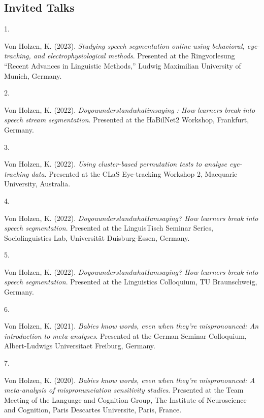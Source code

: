 \documentclass[10pt,a4paper,]{article}
\newlength{\cslhangindent}
\newlength{\csllabelwidth}
\newcommand{\CSLLeftMargin}[1]{\parbox[t]{\csllabelwidth}{\hfill #1~}}
\newcommand{\CSLRightInline}[1]{\parbox[t]{\linewidth - \cslhangindent - \csllabelwidth}{#1}\vspace{0.8ex}}
\begin{document}
\hypertarget{invited-talks}{%
\subsection{Invited Talks}\label{invited-talks}}

\hypertarget{bibliography}{}
\leavevmode{}%
\CSLLeftMargin{1. }%
\CSLRightInline{Von Holzen, K. (2023). \emph{Studying speech
segmentation online using behavioral, eye-tracking, and
electrophysiological methods}. Presented at the Ringvorlesung {``Recent
Advances in Linguistic Methods,''} Ludwig Maximilian University of
Munich, Germany.}

\leavevmode{}%
\CSLLeftMargin{2. }%
\CSLRightInline{Von Holzen, K. (2022). \emph{Doyouunderstandwhatimsaying
: How learners break into speech stream segmentation}. Presented at the
HaBilNet2 Workshop, Frankfurt, Germany.}

\leavevmode{}%
\CSLLeftMargin{3. }%
\CSLRightInline{Von Holzen, K. (2022). \emph{Using cluster-based
permutation tests to analyse eye-tracking data}. Presented at the CLaS
Eye-tracking Workshop 2, Macquarie University, Australia.}

\leavevmode{}%
\CSLLeftMargin{4. }%
\CSLRightInline{Von Holzen, K. (2022).
\emph{DoyouunderstandwhatIamsaying? How learners break into speech
segmentation}. Presented at the LinguisTisch Seminar Series,
Sociolinguistics Lab, Universität Duisburg-Essen, Germany.}

\leavevmode{}%
\CSLLeftMargin{5. }%
\CSLRightInline{Von Holzen, K. (2022).
\emph{DoyouunderstandwhatIamsaying? How learners break into speech
segmentation}. Presented at the Linguistics Colloquium, TU Braunschweig,
Germany.}

\leavevmode{}%
\CSLLeftMargin{6. }%
\CSLRightInline{Von Holzen, K. (2021). \emph{Babies know words, even
when they're mispronounced: An introduction to meta-analyses}. Presented
at the German Seminar Colloquium, Albert-Ludwigs Universitaet Freiburg,
Germany.}

\leavevmode{}%
\CSLLeftMargin{7. }%
\CSLRightInline{Von Holzen, K. (2020). \emph{Babies know words, even
when they're mispronounced: A meta-analysis of mispronunciation
sensitivity studies}. Presented at the Team Meeting of the Language and
Cognition Group, The Institute of Neuroscience and Cognition, Paris
Descartes Universite, Paris, France.}
\end{document}
